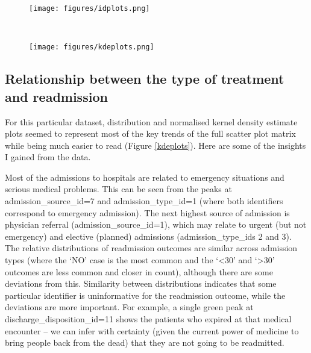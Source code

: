 \documentclass[10pt, twocolumn]{article}
\begin{document}

\begin{figure*}[t!]
	\centering
	\begin{subfigure}[t]{\textwidth}
        \centering
        \texttt{[image: figures/idplots.png]}
	\end{subfigure}
	~
	\begin{subfigure}[t]{\textwidth}
        \centering
		\texttt{[image: figures/kdeplots.png]}
    \end{subfigure}
	\caption{Histograms of admission and discharge identifiers; kernel density estimates for numerical features.}\label{kdeplots}
  \end{figure*}

\subsection{Relationship between the type of treatment and readmission}

For this particular dataset, distribution and normalised kernel density estimate plots seemed to represent most of the key trends of the full scatter plot matrix while being much easier to read (Figure \ref{kdeplots}). Here are some of the insights I gained from the data.

Most of the admissions to hospitals are related to emergency situations and serious medical problems. This can be seen from the peaks at admission\_source\_id=7 and admission\_type\_id=1 (where both identifiers correspond to emergency admission). The next highest source of admission is physician referral (admission\_source\_id=1), which may relate to urgent (but not emergency) and elective (planned) admissions (admission\_type\_ids 2 and 3). The relative distributions of readmission outcomes are similar across admission types (where the `NO' case is the most common and the `<30' and `>30' outcomes are less common and closer in count), although there are some deviations from this. Similarity between distributions indicates that some particular identifier is uninformative for the readmission outcome, while the deviations are more important. For example, a single green peak at discharge\_disposition\_id=11 shows the patients who expired at that medical encounter -- we can infer with certainty (given the current power of medicine to bring people back from the dead) that they are not going to be readmitted.
\end{document}

